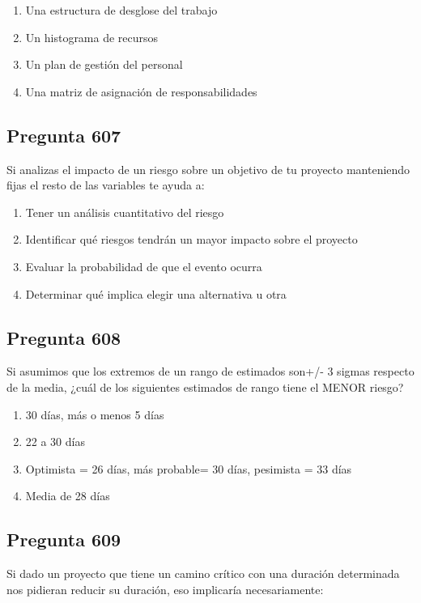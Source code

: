 \documentclass[11pt,a4paper]{article}
\begin{document}
\begin{enumerate}[label=\alph*)]
  \item Una estructura de desglose del trabajo
  \item Un histograma de recursos
  \item Un plan de gestión del personal
  \item Una matriz de asignación de responsabilidades
\end{enumerate}

\subsection*{Pregunta 607}
Si analizas el impacto de un riesgo sobre un objetivo de tu proyecto manteniendo fijas el resto de las variables te ayuda a:

\begin{enumerate}[label=\alph*)]
  \item Tener un análisis cuantitativo del riesgo
  \item Identificar qué riesgos tendrán un mayor impacto sobre el proyecto
  \item Evaluar la probabilidad de que el evento ocurra
  \item Determinar qué implica elegir una alternativa u otra
\end{enumerate}

\subsection*{Pregunta 608}
Si asumimos que los extremos de un rango de estimados son+/- 3 sigmas respecto de la media, ¿cuál de los siguientes estimados de rango tiene el MENOR riesgo?

\begin{enumerate}[label=\alph*)]
  \item 30 días, más o menos 5 días
  \item 22 a 30 días
  \item Optimista = 26 días, más probable= 30 días, pesimista = 33 días
  \item Media de 28 días
\end{enumerate}

\subsection*{Pregunta 609}
Si dado un proyecto que tiene un camino crítico con una duración determinada nos pidieran reducir su duración, eso implicaría necesariamente:
\end{document}
